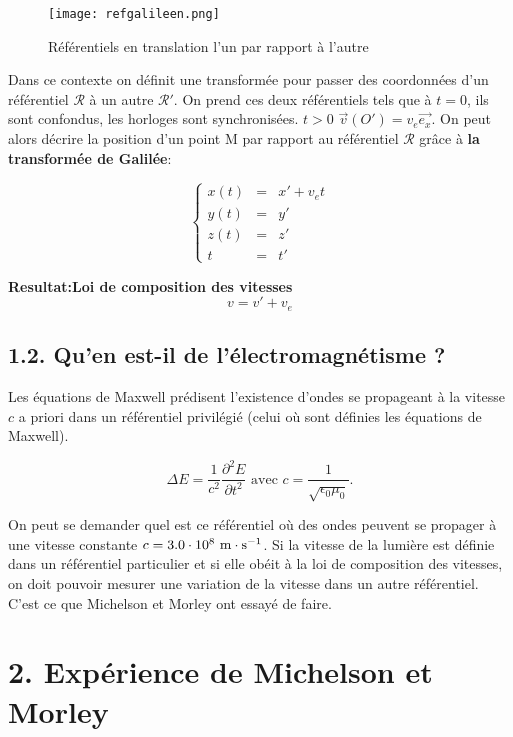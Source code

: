 \documentclass[french, a4paper, 10pt, twocolumn, landscape]{article}
\begin{document}
\begin{figure}[ht!]
 	\centering
 	\texttt{[image: refgalileen.png]}
 	\caption{Référentiels en translation l'un par rapport à l'autre}
\end{figure}

Dans ce contexte on définit une transformée pour passer des coordonnées d'un référentiel $\mathcal{R}$ à un autre $\mathcal{R}'$. On prend ces deux référentiels tels que à $t=0$, ils sont confondus, les horloges sont synchronisées. $t>0$ $\vec{v}(O') = v_e\vec{e_x}$. On peut alors décrire la position d'un point M par rapport au référentiel $\mathcal{R}$ grâce à \textbf{la transformée de Galilée}:


\begin{equation}
	\left\{\begin{array}{rcl}
		x(t) &=& x'+v_e t\\
		y(t) &=& y'\\
		z(t) &=& z'\\
		t &=& t'
	\end{array}\right.
\end{equation}

\textbf{Resultat:Loi de composition des vitesses}
	\begin{equation}
		v = v'+v_e
	\end{equation}


\subsection*{1.2. Qu'en est-il de l'électromagnétisme ?}
Les équations de Maxwell prédisent l'existence d'ondes se propageant à la vitesse $c$ a priori dans un référentiel privilégié (celui où sont définies les équations de Maxwell).

\begin{equation}
	\Delta E = \dfrac{1}{c^2}\dfrac{\partial^2 E}{\partial t^2} \text{ avec } c=\dfrac{1}{\sqrt{\epsilon_0\mu_0}}.
\end{equation}

On peut se demander quel est ce référentiel où des ondes peuvent se propager à une vitesse constante $c=3.0\cdot10^8~\rm m\cdot s^{-1}$. Si la vitesse de la lumière est définie dans un référentiel particulier et si elle obéit à la loi de composition des vitesses, on doit pouvoir mesurer une variation de la vitesse dans un autre référentiel. C'est ce que Michelson et Morley ont essayé de faire. 

\section*{2. Expérience de Michelson et Morley}
\end{document}
